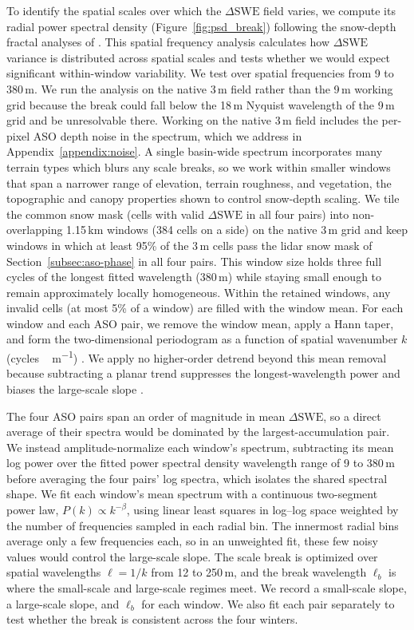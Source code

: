 \documentclass[tc, manuscript]{copernicus}
\begin{document}
To identify the spatial scales over which the $\Delta\mathrm{SWE}$ field varies, we compute its radial power spectral density (Figure~\ref{fig:psd_break}) following the snow-depth fractal analyses of \citet{trujillo2007topographic-0ec}. This spatial frequency analysis calculates how $\Delta\mathrm{SWE}$ variance is distributed across spatial scales and tests whether we would expect significant within-window variability. We test over spatial frequencies from 9 to 380\,\unit{m}. We run the analysis on the native 3\,\unit{m} field rather than the 9\,\unit{m} working grid because the break could fall below the 18\,\unit{m} Nyquist wavelength of the 9\,\unit{m} grid and be unresolvable there. Working on the native 3\,\unit{m} field includes the per-pixel ASO depth noise in the spectrum, which we address in Appendix~\ref{appendix:noise}. A single basin-wide spectrum incorporates many terrain types which blurs any scale breaks, so we work within smaller windows that span a narrower range of elevation, terrain roughness, and vegetation, the topographic and canopy properties shown to control snow-depth scaling. We tile the common snow mask (cells with valid $\Delta\mathrm{SWE}$ in all four pairs) into non-overlapping 1.15\,\unit{km} windows (384 cells on a side) on the native 3\,\unit{m} grid and keep windows in which at least 95\% of the 3\,\unit{m} cells pass the lidar snow mask of Section~\ref{subsec:aso-phase} in all four pairs. This window size holds three full cycles of the longest fitted wavelength (380\,\unit{m}) while staying small enough to remain approximately locally homogeneous. Within the retained windows, any invalid cells (at most 5\% of a window) are filled with the window mean. For each window and each ASO pair, we remove the window mean, apply a Hann taper, and form the two-dimensional periodogram as a function of spatial wavenumber $k$ (\unit{cycles\,m^{-1}}) \citep{harris1978use-0d1}. We apply no higher-order detrend beyond this mean removal because subtracting a planar trend suppresses the longest-wavelength power and biases the large-scale slope \citep{deems2006}.

The four ASO pairs span an order of magnitude in mean $\Delta\mathrm{SWE}$, so a direct average of their spectra would be dominated by the largest-accumulation pair. We instead amplitude-normalize each window's spectrum, subtracting its mean log power over the fitted power spectral density wavelength range of 9 to 380\,\unit{m} before averaging the four pairs' log spectra, which isolates the shared spectral shape. We fit each window's mean spectrum with a continuous two-segment power law, $P(k)\propto k^{-\beta}$, using linear least squares in log--log space weighted by the number of frequencies sampled in each radial bin. The innermost radial bins average only a few frequencies each, so in an unweighted fit, these few noisy values would control the large-scale slope. The scale break is optimized over spatial wavelengths $\ell=1/k$ from 12 to 250\,\unit{m}, and the break wavelength $\ell_b$ is where the small-scale and large-scale regimes meet. We record a small-scale slope, a large-scale slope, and $\ell_b$ for each window. We also fit each pair separately to test whether the break is consistent across the four winters.
\end{document}
